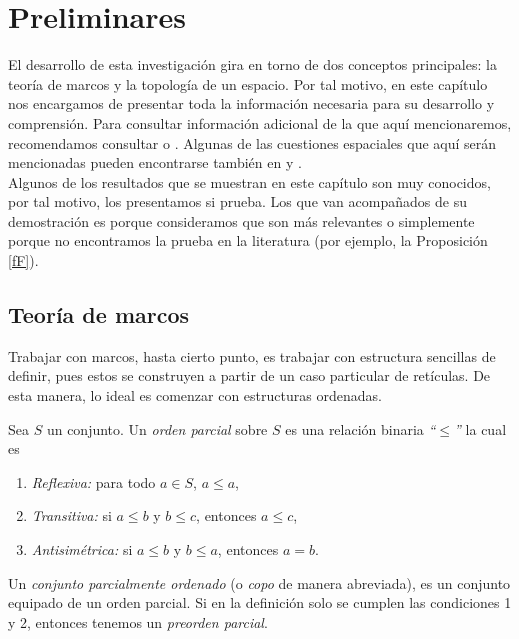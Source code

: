 \chapter{Preliminares}\label{Preliminares}

El desarrollo de esta investigación gira en torno de dos conceptos principales: la teoría de marcos y la topología de un espacio. 
Por tal motivo, en este capítulo nos encargamos de presentar toda la información necesaria para su desarrollo y comprensión.
Para consultar información adicional de la que aquí mencionaremos, recomendamos consultar \cite{P.T.} o \cite{J.P.}. 
Algunas de las cuestiones espaciales que aquí serán mencionadas pueden encontrarse también en \cite{R.S.} y \cite{R.S.3}.\\

Algunos de los resultados que se muestran en este capítulo son muy conocidos, por tal motivo, los presentamos si prueba. 
Los que van acompañados de su demostración es porque consideramos que son más relevantes o simplemente porque no encontramos la prueba 
en la literatura (por ejemplo, la Proposición \ref{fF}).

\section{Teoría de marcos}\label{marcos}

Trabajar con marcos, hasta cierto punto, es trabajar con estructura sencillas de definir, pues estos se construyen a partir de un caso particular de retículas. De esta manera, 
lo ideal es comenzar con estructuras ordenadas.

\begin{dfn}\label{Copo}
Sea $S$ un conjunto. Un \emph{orden parcial} sobre $S$ es una relación binaria \emph{``$\leq$''} la cual es 
\begin{enumerate}
\item \emph{Reflexiva:} para todo $a\in S$, $a\leq a$,
\item \emph{Transitiva:} si $a\leq b$ y $b\leq c$, entonces $a\leq c$,
\item \emph{Antisimétrica:} si $a\leq b$ y $b\leq a$, entonces $a=b$. 
\end{enumerate}
Un \emph{conjunto parcialmente ordenado} (o \emph{copo} de manera abreviada), es un conjunto equipado de un orden parcial. Si en la definición solo se cumplen las condiciones 1 y 2, entonces tenemos un \emph{preorden parcial}.
\end{dfn}

